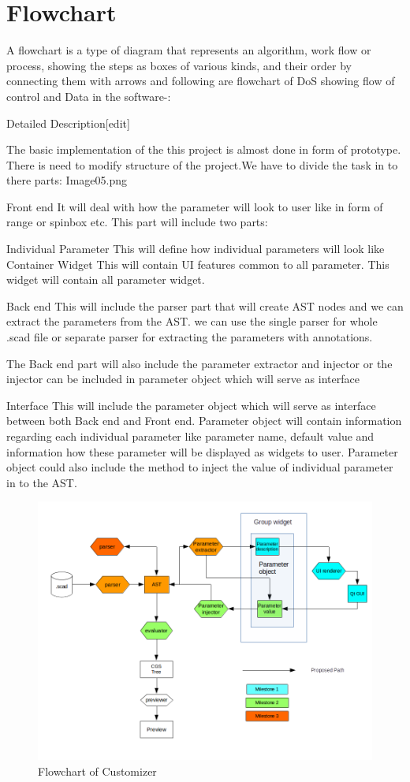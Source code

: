 \section{Flowchart}
A flowchart is a type of diagram that represents an algorithm, work flow or process, showing the steps as boxes of various kinds, and their order by connecting them with arrows
and following are flowchart of DoS showing flow of control and Data in the software-:

Detailed Description[edit]

The basic implementation of the this project is almost done in form of prototype. There is need to modify structure of the project.We have to divide the task in to there parts:
Image05.png

Front end
It will deal with how the parameter will look to user like in form of range or spinbox etc. This part will include two parts:

Individual Parameter
This will define how individual parameters will look like
Container Widget
This will contain UI features common to all parameter. This widget will contain all parameter widget. 

Back end
This will include the parser part that will create AST nodes and we can extract the parameters from the AST. we can use the single parser for whole .scad file or separate parser for extracting the parameters with annotations.

The Back end part will also include the parameter extractor and injector or the injector can be included in parameter object which will serve as interface 

Interface
This will include the parameter object which will serve as interface between both Back end and Front end. Parameter object will contain information regarding each individual parameter like parameter name, default value and information how these parameter will be displayed as widgets to user. Parameter object could also include the method to inject the value of individual parameter in to the AST. 

\begin{figure}[H]
\centering \includegraphics[scale=0.6]{images/flowchart.png}
\caption{Flowchart of Customizer}
\label{fig:FD1}
\end{figure}
